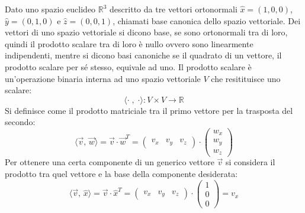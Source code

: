 \documentclass{article}
\numberwithin{equation}{subsection}
\begin{document}
Dato uno spazio euclideo $\mathbb{R}^3$ descritto da tre vettori ortonormali $\hat x=(1,0,0)$, $\hat y=(0,1,0)$ e $\hat z=(0,0,1)$, chiamati base canonica dello spazio vettoriale. 
Dei vettori di uno spazio vettoriale si dicono base, se sono ortonormali tra di loro, quindi il prodotto scalare tra di loro è nullo ovvero sono linearmente indipendenti, 
mentre si dicono basi canoniche se il quadrato di un vettore, il prodotto scalare per sé stesso, equivale ad uno. 
Il prodotto scalare è un'operazione binaria interna ad uno spazio vettoriale $V$ che resitituisce uno scalare:
\begin{equation*}
    \langle \cdot \; , \; \cdot \rangle : V \times V  \rightarrow \mathbb{R}
\end{equation*}
Si definisce come il prodotto matriciale tra il primo vettore per la trasposta del secondo:
\begin{equation*}
    \langle\vec v,\,\vec w\rangle=\vec v\cdot \vec w^T=\begin{pmatrix}
        v_x &v_y&v_z
    \end{pmatrix}\cdot\begin{pmatrix}
        w_x\\ w_y \\ w_z
    \end{pmatrix}
\end{equation*} 
Per ottenere una certa componente di un generico vettore $\vec{v}$ si considera il prodotto tra quel vettore e la base della componente desiderata:
\begin{equation*}
    \langle\vec v,\,\hat x\rangle=\vec v\cdot \hat x^T=\begin{pmatrix}
        v_x &v_y&v_z
    \end{pmatrix}\cdot\begin{pmatrix}
        1\\ 0 \\0
    \end{pmatrix}=v_x
\end{equation*} 
\end{document}
